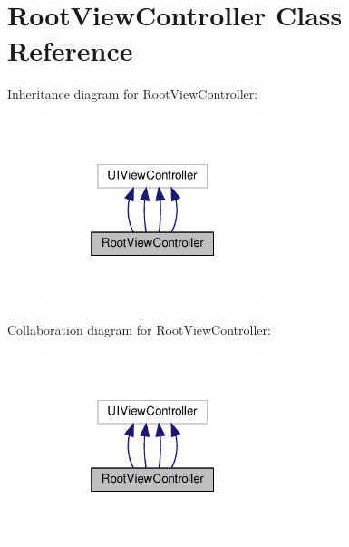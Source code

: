 \hypertarget{interfaceRootViewController}{}\section{Root\+View\+Controller Class Reference}
\label{interfaceRootViewController}


Inheritance diagram for Root\+View\+Controller\+:
\nopagebreak
\begin{figure}[H]
\begin{center}
\leavevmode
\includegraphics[width=181pt]{interfaceRootViewController__inherit__graph}
\end{center}
\end{figure}


Collaboration diagram for Root\+View\+Controller\+:
\nopagebreak
\begin{figure}[H]
\begin{center}
\leavevmode
\includegraphics[width=181pt]{interfaceRootViewController__coll__graph}
\end{center}
\end{figure}

